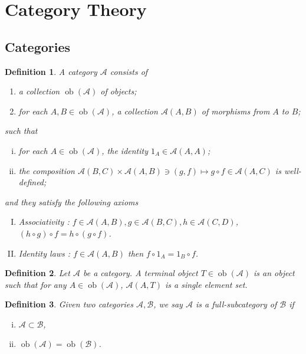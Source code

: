 \documentclass{article}
\newtheorem{definition}{Definition}[section]
\numberwithin{equation}{section}
\DeclareMathOperator{\ob}{ob}
\begin{document}
\section{Category Theory}

\subsection{Categories}

\begin{definition}
A category $\mathcal{A}$ consists of
\begin{enumerate}[\textbullet]
\item a collection $\ob(\mathcal{A})$ of objects;
\item for each $A,B\in\ob(\mathcal{A})$, a collection $\mathcal{A}(A,B)$ of morphisms from $A$ to $B$;
\end{enumerate}
such that 
\begin{enumerate}[i).]
\item for each $A\in\ob(\mathcal{A})$, the identity $1_A\in\mathcal{A}(A,A)$;
\item the composition $\mathcal{A}(B,C)\times\mathcal{A}(A,B)\ni(g,f)\mapsto g\circ f\in\mathcal{A}(A,C)$ is well-defined;
\end{enumerate}
and they satisfy the following axioms
\begin{enumerate}[I).]
\item Associativity : $f\in\mathcal{A}(A,B),g\in\mathcal{A}(B,C),h\in\mathcal{A}(C,D)$, $(h\circ g)\circ f = h\circ (g\circ f)$.
\item Identity laws : $f\in\mathcal{A}(A,B)$ then $f\circ 1_A = 1_B\circ f$.
\end{enumerate}
\end{definition}

\begin{definition}
Let $\mathcal{A}$ be a category. A terminal object $T\in\ob(\mathcal{A})$ is an object such that for any $A\in\ob(\mathcal{A})$, $\mathcal{A}(A,T)$ is a single element set.
\end{definition}

\begin{definition}
Given two categories $\mathcal{A},\mathcal{B}$, we say $\mathcal{A}$ is a full-subcategory of $\mathcal{B}$ if 
\begin{enumerate}[i).]
\item $\mathcal{A}\subset\mathcal{B}$,
\item $\ob(\mathcal{A})=\ob(\mathcal{B})$.
\end{enumerate}
\end{definition}
\end{document}
